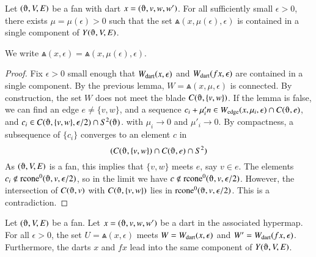 
\begin{lemma}
Let $(\orgn,V,E)$ be a fan with dart
$x=(\orgn,v,w,w')$.
For all sufficiently small $\epsilon > 0$, there exists
$\mu=\mu(\epsilon)>0$ such that
the set $\Wedge(x,\mu(\epsilon),\epsilon)$ is
contained in a single component of $Y(\orgn,V,E)$.
\end{lemma}

We write $\Wedge(x,\epsilon) = \Wedge(x,\mu(\epsilon),\epsilon)$.

\begin{proof}  Fix $\epsilon>0$ small enough that $W_{\text{dart}}(x,\epsilon)$
and $W_{\text{dart}}(f x,\epsilon)$ are contained in a single component.
By the previous lemma, $W=\Wedge(x,\mu,\epsilon)$ 
is connected.  
By construction, the set $W$ does not meet the blade
$C(\orgn,\{v,w\})$.  If the lemma is false, we can find an
edge $e\ne \{v,w\}$,
and
a sequence $c_i + \mu'_i n \in \Wedge(x,\mu_i,\epsilon) 
\cap C(\orgn,e)$, and $c_i\in C(\orgn,\{v,w\},\epsilon/2) 
 \cap S^2(\orgn)$. 
with $\mu_i \to 0$ and $\mu'_i\to 0$. 
By compactness, a subsequence
of  $\{c_i\}$ converges to an
element $c$ in 
  $$(C(\orgn,\{v,w\})\cap C(\orgn,e)\cap S^2)
  $$
As $(\orgn,V,E)$ is a fan, this
implies that $\{v,w\}$ meets $e$, say $v\in e$.
The elements $c_i\not\in \op{rcone}^0(\orgn,v,\epsilon/2)$, so
in the limit we have $c\not\in\op{rcone}^0(\orgn,v,\epsilon/2)$.
However, the intersection of $C(\orgn,v)$ with $C(\orgn,\{v,w\})$
lies in $\op{rcone}^0(\orgn,v,\epsilon/2)$.  This is a contradiction.
\end{proof}

\begin{lemma}
Let $(\orgn,V,E)$ be a fan.
Let $x=(\orgn,v,w,w')$ be a dart in the associated hypermap.
For all $\epsilon > 0$,
the set $U=\Wedge(x,\epsilon)$ meets $W=W_{\text{dart}}(x,\epsilon)$ and 
$W'=W_{\text{dart}}(f x,\epsilon)$.
Furthermore, the darts $x$ and $f x$ lead into the same
component of $Y(\orgn,V,E)$.
\end{lemma}

